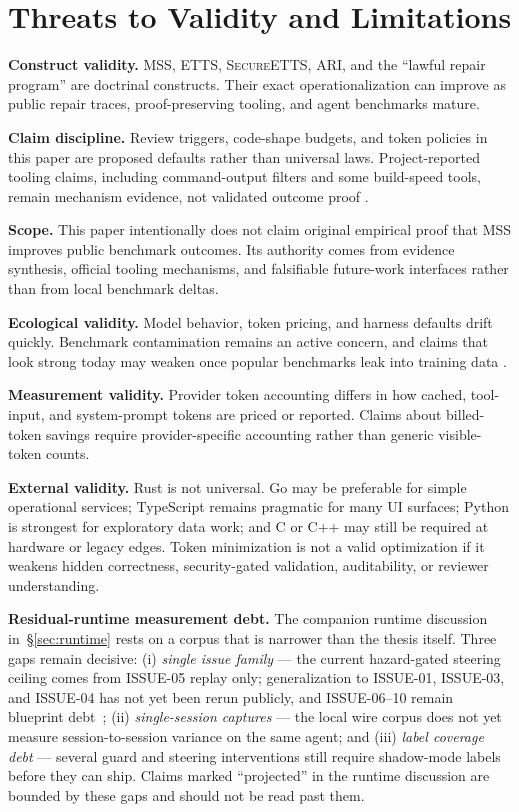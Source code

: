 \documentclass[conference]{IEEEtran}
\newcommand{\ari}{\textnormal{\textsc{ARI}}}
\newcommand{\etts}{\textnormal{\textsc{ETTS}}}
\newcommand{\secureetts}{\textnormal{\textsc{SecureETTS}}}
\newcommand{\mss}{\textnormal{\textsc{MSS}}}
\begin{document}
\section{Threats to Validity and Limitations}
\label{sec:validity}
\noindent\textbf{Construct validity.} \mss{}, \etts{}, \secureetts{}, \ari{}, and the ``lawful repair program'' are doctrinal constructs. Their exact operationalization can improve as public repair traces, proof-preserving tooling, and agent benchmarks mature.

\noindent\textbf{Claim discipline.} Review triggers, code-shape budgets, and token policies in this paper are proposed defaults rather than universal laws. Project-reported tooling claims, including command-output filters and some build-speed tools, remain mechanism evidence, not validated outcome proof \cite{rtk2026}.

\noindent\textbf{Scope.} This paper intentionally does not claim original empirical proof that \mss{} improves public benchmark outcomes. Its authority comes from evidence synthesis, official tooling mechanisms, and falsifiable future-work interfaces rather than from local benchmark deltas.

\noindent\textbf{Ecological validity.} Model behavior, token pricing, and harness defaults drift quickly. Benchmark contamination remains an active concern, and claims that look strong today may weaken once popular benchmarks leak into training data \cite{openaiSwebVerified2026}.

\noindent\textbf{Measurement validity.} Provider token accounting differs in how cached, tool-input, and system-prompt tokens are priced or reported. Claims about billed-token savings require provider-specific accounting rather than generic visible-token counts.

\noindent\textbf{External validity.} Rust is not universal. Go may be preferable for simple operational services; TypeScript remains pragmatic for many UI surfaces; Python is strongest for exploratory data work; and C or C++ may still be required at hardware or legacy edges. Token minimization is not a valid optimization if it weakens hidden correctness, security-gated validation, auditability, or reviewer understanding.

\noindent\textbf{Residual-runtime measurement debt.} The companion runtime discussion in~\S\ref{sec:runtime} rests on a corpus that is narrower than the thesis itself. Three gaps remain decisive: (i) \emph{single issue family} --- the current hazard-gated steering ceiling comes from ISSUE-05 replay only; generalization to ISSUE-01, ISSUE-03, and ISSUE-04 has not yet been rerun publicly, and ISSUE-06--10 remain blueprint debt~\cite{warposInterventionCatalog2026,warposFiveAgentCorpus2026}; (ii) \emph{single-session captures} --- the local wire corpus does not yet measure session-to-session variance on the same agent; and (iii) \emph{label coverage debt} --- several guard and steering interventions still require shadow-mode labels before they can ship. Claims marked ``projected'' in the runtime discussion are bounded by these gaps and should not be read past them.
\end{document}
